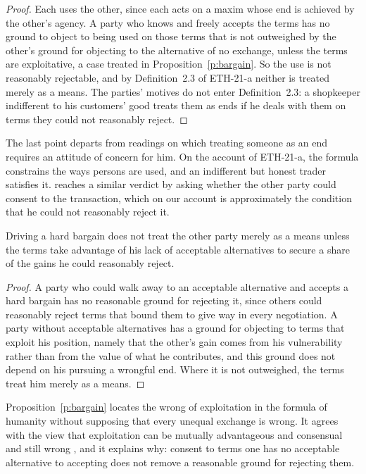 \documentclass{situationist-preprint}
\begin{document}
\begin{proof}
Each uses the other, since each acts on a maxim whose end is achieved by the other's agency. A party who knows and freely accepts the terms has no ground to object to being used on those terms that is not outweighed by the other's ground for objecting to the alternative of no exchange, unless the terms are exploitative, a case treated in Proposition~\ref{p:bargain}. So the use is not reasonably rejectable, and by Definition~2.3 of ETH-21-a neither is treated merely as a means. The parties' motives do not enter Definition~2.3: a shopkeeper indifferent to his customers' good treats them as ends if he deals with them on terms they could not reasonably reject.
\end{proof}

The last point departs from readings on which treating someone as an end requires an attitude of concern for him. On the account of ETH-21-a, the formula constrains the ways persons are used, and an indifferent but honest trader satisfies it. \citet{ONeill1985} reaches a similar verdict by asking whether the other party could consent to the transaction, which on our account is approximately the condition that he could not reasonably reject it.

\begin{proposition}[Bargaining]\label{p:bargain}
Driving a hard bargain does not treat the other party merely as a means unless the terms take advantage of his lack of acceptable alternatives to secure a share of the gains he could reasonably reject.
\end{proposition}

\begin{proof}
A party who could walk away to an acceptable alternative and accepts a hard bargain has no reasonable ground for rejecting it, since others could reasonably reject terms that bound them to give way in every negotiation. A party without acceptable alternatives has a ground for objecting to terms that exploit his position, namely that the other's gain comes from his vulnerability rather than from the value of what he contributes, and this ground does not depend on his pursuing a wrongful end. Where it is not outweighed, the terms treat him merely as a means.
\end{proof}

Proposition~\ref{p:bargain} locates the wrong of exploitation in the formula of humanity without supposing that every unequal exchange is wrong. It agrees with the view that exploitation can be mutually advantageous and consensual and still wrong \citep{Wertheimer1996}, and it explains why: consent to terms one has no acceptable alternative to accepting does not remove a reasonable ground for rejecting them.
\end{document}
